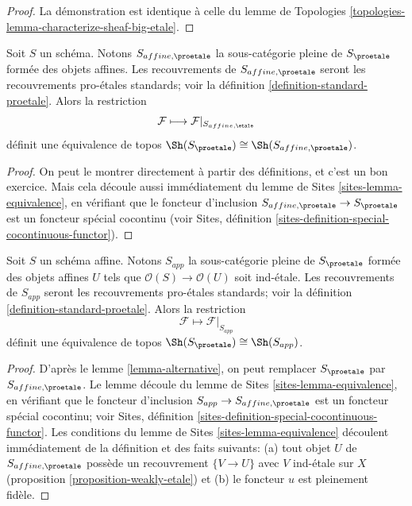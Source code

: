 \begin{proof}
La démonstration est identique à celle du
lemme de Topologies \ref{topologies-lemma-characterize-sheaf-big-etale}.
\end{proof}

\begin{lemma}
\label{lemma-alternative}
Soit $S$ un schéma. Notons $S_{affine, \proetale}$ la sous-catégorie pleine
de $S_\proetale$ formée des objets affines. Les recouvrements de
$S_{affine, \proetale}$ seront les recouvrements pro-\'etales standards; voir la
définition \ref{definition-standard-proetale}.
Alors la restriction
$$
\mathcal{F} \longmapsto \mathcal{F}|_{S_{affine, \etale}}
$$
définit une équivalence de topos
$\Sh(S_\proetale) \cong \Sh(S_{affine, \proetale})$.
\end{lemma}

\begin{proof}
On peut le montrer directement à partir des définitions, et c'est un bon exercice.
Mais cela découle aussi immédiatement du
lemme de Sites \ref{sites-lemma-equivalence},
en vérifiant que le foncteur d'inclusion
$S_{affine, \proetale} \to S_\proetale$
est un foncteur spécial cocontinu (voir
Sites, définition \ref{sites-definition-special-cocontinuous-functor}).
\end{proof}

\begin{lemma}
\label{lemma-affine-alternative}
Soit $S$ un schéma affine. Notons $S_{app}$ la sous-catégorie pleine
de $S_\proetale$ formée des objets affines $U$ tels que
$\mathcal{O}(S) \to \mathcal{O}(U)$ soit ind-\'etale. Les recouvrements de
$S_{app}$ seront les recouvrements pro-\'etales standards; voir la
définition \ref{definition-standard-proetale}.
Alors la restriction
$$
\mathcal{F} \longmapsto \mathcal{F}|_{S_{app}}
$$
définit une équivalence de topos $\Sh(S_\proetale) \cong \Sh(S_{app})$.
\end{lemma}

\begin{proof}
D'après le lemme \ref{lemma-alternative}, on peut remplacer $S_\proetale$ par
$S_{affine, \proetale}$.
Le lemme découle du lemme de Sites \ref{sites-lemma-equivalence},
en vérifiant que le foncteur d'inclusion $S_{app} \to S_{affine, \proetale}$
est un foncteur spécial cocontinu; voir
Sites, définition \ref{sites-definition-special-cocontinuous-functor}.
Les conditions du lemme de Sites \ref{sites-lemma-equivalence}
découlent immédiatement de la définition et des faits suivants:
(a) tout objet $U$ de $S_{affine, \proetale}$ possède un recouvrement
$\{V \to U\}$ avec $V$ ind-\'etale sur $X$
(proposition \ref{proposition-weakly-etale})
et (b) le foncteur $u$ est pleinement fidèle.
\end{proof}

